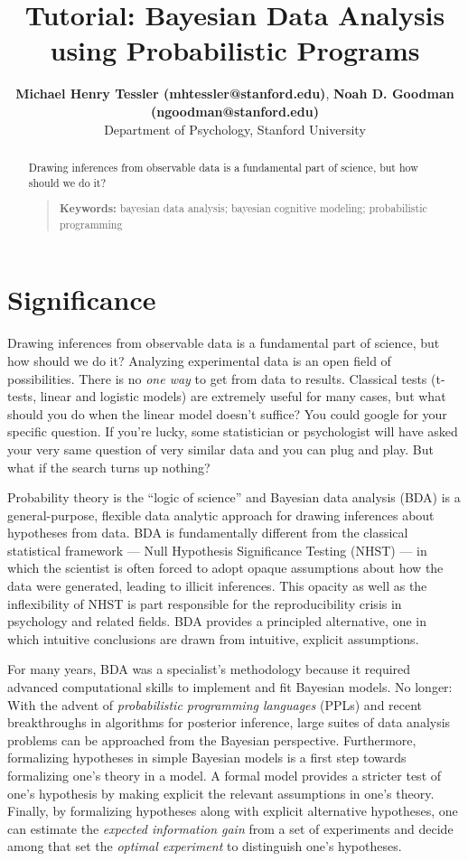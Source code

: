 \documentclass[10pt,letterpaper]{article}
\title{Tutorial: Bayesian Data Analysis using Probabilistic Programs}
\author{{\large \bf Michael Henry Tessler (mhtessler@stanford.edu)}, {\large \bf Noah D. Goodman (ngoodman@stanford.edu)}  \\
  Department of Psychology, Stanford University
  }
\begin{document}
\maketitle

\begin{abstract}

Drawing inferences from observable data is a fundamental part of science, but how should we do it?
\begin{quote}
\small
\textbf{Keywords:} 
bayesian data analysis; bayesian cognitive modeling; probabilistic programming
\end{quote}

\end{abstract}





\section{Significance}

Drawing inferences from observable data is a fundamental part of science, but how should we do it?
Analyzing experimental data is an open field of possibilities. 
There is no \emph{one way} to get from data to results. 
Classical tests (t-tests, linear and logistic models) are extremely useful for many cases, but what should you do when the linear model doesn't suffice? 
You could google for your specific question. 
If you're lucky, some statistician or psychologist will have asked your very same question of very similar data and you can plug and play. 
But what if the search turns up nothing?

Probability theory is the ``logic of science'' \cite{Jaynes2003} and Bayesian data analysis (BDA) is a general-purpose, flexible data analytic approach for drawing inferences about hypotheses from data.
BDA is fundamentally different from the classical statistical framework --- Null Hypothesis Significance Testing (NHST) --- in which the scientist is often forced to adopt opaque assumptions about how the data were generated, leading to illicit inferences.
This opacity as well as the inflexibility of NHST is part responsible for the reproducibility crisis in psychology and related fields. 
BDA provides a principled alternative, one in which intuitive conclusions are drawn from intuitive, explicit assumptions.

For many years, BDA was a specialist's methodology because it required advanced computational skills to implement and fit Bayesian models.
No longer: With the advent of \emph{probabilistic programming languages} (PPLs) and recent breakthroughs in algorithms for posterior inference, large suites of data analysis problems can be approached from the Bayesian perspective. 
Furthermore, formalizing hypotheses in simple Bayesian models is a first step towards formalizing one's theory in a model. 
A formal model provides a stricter test of one's hypothesis by making explicit the relevant assumptions in one's theory. 
Finally, by formalizing hypotheses along with explicit alternative hypotheses, one can estimate the \emph{expected information gain} from a set of experiments and decide among that set the \emph{optimal experiment} to distinguish one's hypotheses. 
\end{document}
